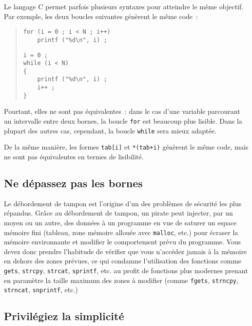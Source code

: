\documentclass {article}
\begin{document}
Le langage C permet parfois plusieurs syntaxes pour atteindre le même
objectif. Par exemple, les deux boucles suivantes génèrent le même
code~:

\begin {quote}
\begin {minipage} {.4\textwidth}
\begin {lstlisting}
for (i = 0 ; i < N ; i++)
    printf ("%
\end{lstlisting}
\end {minipage}
\hfill
\begin {minipage} {.4\textwidth}
\begin {lstlisting}
i = 0 ;
while (i < N)
{
    printf ("%
    i++ ;
}
\end{lstlisting}
\end {minipage}
\end {quote}

Pourtant, elles ne sont pas équivalentes~: dans le cas d'une variable
parcourant un intervalle entre deux bornes, la boucle \texttt {for}
est beaucoup plus lisible. Dans la plupart des autres cas, cependant,
la boucle \texttt {while} sera mieux adaptée.

De la même manière, les formes \texttt {tab[i]} et \texttt {*(tab+i)}
génèrent le même code, mais ne sont pas équivalentes en termes
de lisibilité.


\subsection {Ne dépassez pas les bornes}

Le débordement de tampon est l'origine d'un des problèmes de sécurité
les plus répandus. Grâce au débordement de tampon, un pirate peut
injecter, par un moyen ou un autre, des données à un programme en vue
de saturer un espace mémoire fini (tableau, zone mémoire allouée avec
\texttt {malloc}, etc.) pour écraser la mémoire environnante et modifier
le comportement prévu du programme.  Vous devez donc prendre l'habitude
de vérifier que vous n'accédez jamais à la mémoire en dehors des
zones prévues, ce qui condamne l'utilisation des fonctions comme
\texttt {gets}, \texttt {strcpy}, \texttt {strcat}, \texttt {sprintf},
etc. au profit de fonctions plus modernes prenant en paramètre la taille
maximum des zones à modifier (comme \texttt {fgets}, \texttt {strncpy},
\texttt {strncat}, \texttt {snprintf}, etc.)


\subsection {Privilégiez la simplicité}
\end{document}
